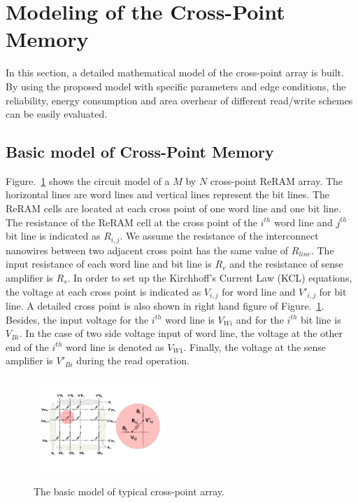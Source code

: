 \section{Modeling of the Cross-Point Memory}\label{sec:model}

In this section, a detailed mathematical model of the cross-point array is built. By using the proposed model with specific parameters and
edge conditions, the reliability, energy consumption and area overhear of different read/write schemes can be easily evaluated.

\subsection{Basic model of Cross-Point Memory}
Figure.~\ref{fig:modeling} shows the circuit model of a $M$ by $N$ cross-point ReRAM array. The horizontal lines are word lines and vertical lines represent the bit lines. The ReRAM cells are located at each cross point of one word line and one bit line. The resistance of the ReRAM cell at the cross point of the $i^{th}$ word line and $j^{th}$ bit line is indicated as $R_{i,j}$. We assume the resistance of the interconnect nanowires between two adjacent cross point has the same value of $R_{line}$. The input resistance of each word line and bit line is $R_v$ and the resistance of sense amplifier is $R_s$. In order to set up the Kirchhoff's Current Law (KCL) equations, the voltage at each cross point is indicated as $V_{i,j}$ for word line and $V'_{i,j}$ for bit line. A detailed cross point is also shown in right hand figure of Figure.~\ref{fig:modeling}. Besides, the input voltage for the $i^{th}$ word line is $V_{Wi}$ and for the $i^{th}$ bit line is $V_{Bi}$. In the case of two side voltage input of word line, the voltage at the other end of the $i^{th}$ word line is denoted as $V_{W1}$. Finally, the voltage at the sense amplifier is $V'_{Bi}$ during the read operation.

\begin{figure}%
\centering
  \includegraphics[width=0.45\textwidth]{./figures/model_reverse.pdf}\\
  \caption{The basic model of typical cross-point array.}\label{fig:modeling}
  \vspace{-12pt}
\end{figure}

